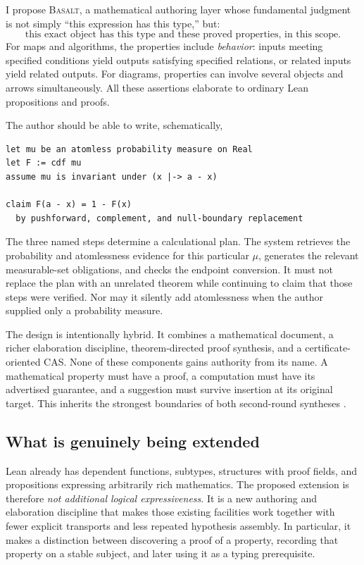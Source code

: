 \documentclass[11pt,a4paper]{article}
\newcommand{\Basalt}{\textsc{Basalt}}
\theoremstyle{plain}
\theoremstyle{definition}
\theoremstyle{remark}
\begin{document}
I propose \Basalt{}, a mathematical authoring layer whose fundamental judgment
is not simply ``this expression has this type,'' but:
\[
 \text{this exact object has this type and these proved properties,
 in this scope.}
\]
For maps and algorithms, the properties include \emph{behavior}: inputs meeting
specified conditions yield outputs satisfying specified relations, or related
inputs yield related outputs. For diagrams, properties can involve several
objects and arrows simultaneously. All these assertions elaborate to ordinary
Lean propositions and proofs.

The author should be able to write, schematically,
\par\noindent\begin{minipage}{\linewidth}
\begin{lstlisting}
let mu be an atomless probability measure on Real
let F := cdf mu
assume mu is invariant under (x |-> a - x)

claim F(a - x) = 1 - F(x)
  by pushforward, complement, and null-boundary replacement
\end{lstlisting}
\end{minipage}\par

The three named steps determine a calculational plan. The system retrieves the
probability and atomlessness evidence for this particular $\mu$, generates the
relevant measurable-set obligations, and checks the endpoint conversion. It
must not replace the plan with an unrelated theorem while continuing to claim
that those steps were verified. Nor may it silently add atomlessness when the
author supplied only a probability measure.

The design is intentionally hybrid. It combines a mathematical document,
a richer elaboration discipline, theorem-directed proof synthesis, and a
certificate-oriented CAS. None of these components gains authority from its
name. A mathematical property must have a proof, a computation must have its
advertised guarantee, and a suggestion must survive insertion at its original
target. This inherits the strongest boundaries of both second-round syntheses
\cite{synthesis,workbenches}.

\subsection{What is genuinely being extended}
Lean already has dependent functions, subtypes, structures with proof fields,
and propositions expressing arbitrarily rich mathematics. The proposed
extension is therefore \emph{not additional logical expressiveness}. It is a
new authoring and elaboration discipline that makes those existing facilities
work together with fewer explicit transports and less repeated hypothesis
assembly. In particular, it makes a distinction between discovering a proof
of a property, recording that property on a stable subject, and later using it
as a typing prerequisite.
\end{document}
